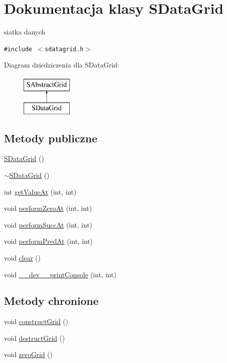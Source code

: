 \hypertarget{classSDataGrid}{
\section{Dokumentacja klasy SDataGrid}
\label{classSDataGrid}
}
siatka danych  


{\tt \#include $<$sdatagrid.h$>$}

Diagram dziedziczenia dla SDataGrid:\begin{figure}[H]
\begin{center}
\leavevmode
\includegraphics[height=2cm]{classSDataGrid}
\end{center}
\end{figure}
\subsection*{Metody publiczne}
\begin{CompactItemize}
\item 
\hyperlink{classSDataGrid_741ea12ba0eec8c00fec30c8730f2192}{SDataGrid} ()
\item 
\hyperlink{classSDataGrid_51645b217b4c668e0e945cdbda1db3ec}{$\sim$SDataGrid} ()
\item 
int \hyperlink{classSDataGrid_7f9dd63d74e36731875630a96ea8dd07}{getValueAt} (int, int)
\item 
void \hyperlink{classSDataGrid_bd825a6b1f64a7410c7c5f2a94af8fb9}{performZeroAt} (int, int)
\item 
void \hyperlink{classSDataGrid_33bf85628d27e5d467d4aff0b67ccd79}{performSuccAt} (int, int)
\item 
void \hyperlink{classSDataGrid_7085f1322b3ad39fcbaa9ca13ca79866}{performPredAt} (int, int)
\item 
void \hyperlink{classSDataGrid_80b67d2da29f99384fb2852828d83b91}{clear} ()
\item 
void \hyperlink{classSDataGrid_8b94af72ddf880b0297baf24ceb2395a}{\_\-\_\-dev\_\-\_\-printConsole} (int, int)
\end{CompactItemize}
\subsection*{Metody chronione}
\begin{CompactItemize}
\item 
void \hyperlink{classSDataGrid_5af888335764c1ba959b6ef964223b6d}{constructGrid} ()
\item 
void \hyperlink{classSDataGrid_c9c0ef298fb96c56f9f9796720a41489}{destructGrid} ()
\item 
void \hyperlink{classSDataGrid_df36584ac2e2d38eda1bd06ad8fad355}{zeroGrid} ()
\end{CompactItemize}
